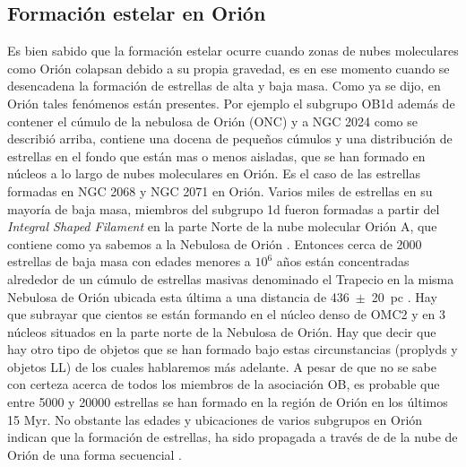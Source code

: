 \subsection{Formación estelar en Orión}
\label{sec:frormacion}

Es bien sabido que la formación estelar ocurre cuando zonas de nubes moleculares como Orión colapsan debido a su propia gravedad, es en ese momento cuando se desencadena la formación de estrellas de alta y baja masa. Como ya se dijo, en Orión tales fenómenos están presentes. Por ejemplo el subgrupo OB1d además de contener el cúmulo de la nebulosa de Orión (ONC) y a NGC 2024 como se describió arriba, contiene una docena de pequeños cúmulos y una distribución de estrellas en el fondo que están mas o menos aisladas, que se han formado en núcleos a lo largo de nubes moleculares en Orión. Es el caso de las estrellas formadas en NGC 2068 y NGC 2071 en Orión. Varios miles de estrellas en su mayoría de baja masa, miembros del subgrupo 1d fueron formadas a partir del \textit{Integral Shaped Filament} \citep{Bally:1987} en la parte Norte de la nube molecular Orión A, que contiene como ya sabemos a la Nebulosa de Orión \citep{Johnstone:1999}. Entonces cerca de 2000 estrellas de baja masa con edades menores a \(10^6\) años están concentradas alrededor de un cúmulo de estrellas masivas denominado el Trapecio en la misma Nebulosa de Orión \citep{Hillenbrand:1997} ubicada esta última a una distancia de 436~\(\pm\)~20~pc \citep{Odell:2008a}. Hay que subrayar que cientos se están formando en el núcleo denso de OMC2 y en 3 núcleos situados en la parte norte de la Nebulosa de Orión. Hay que decir que hay otro tipo de objetos que se han formado bajo estas circunstancias (proplyds y objetos LL) de los cuales hablaremos más adelante. A pesar de que no se sabe con certeza acerca de todos los miembros de la asociación OB, es probable que entre 5000 y 20000 estrellas se han formado en la región de Orión en los últimos 15 Myr. No obstante las edades y ubicaciones de varios subgrupos en Orión indican que la formación de estrellas, ha sido propagada a través de de la nube de Orión de una forma secuencial \citep{Bally:2008a}. \\  
 
